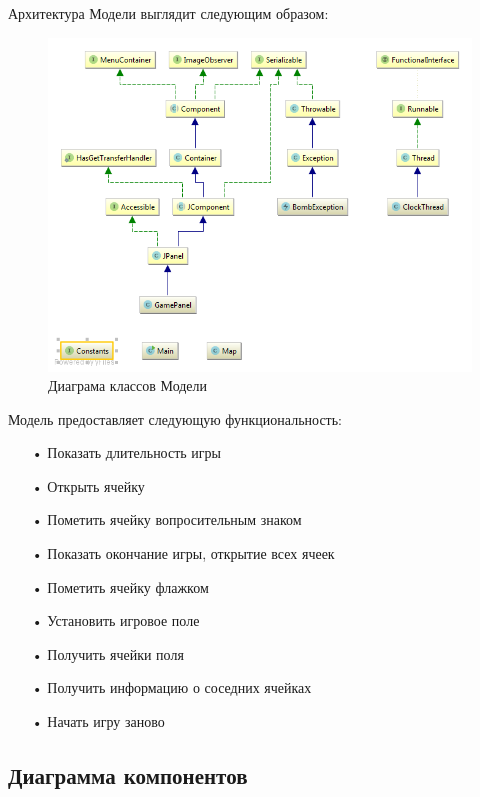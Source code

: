 Архитектура Модели выглядит следующим образом:
\begin{figure}[H]
	\begin{center}
		\includegraphics[scale=0.7]{images/diagram0.png}
		\caption{Диаграма классов Модели} 
		\label{pic:pic_name} %
	\end{center}
\end{figure}

Модель предоставляет следующую функциональность:

\begin{enumerate}  
\item[•]  Показать длительность игры
\item[•]  Открыть ячейку
\item[•]  Пометить ячейку вопросительным знаком
\item[•]  Показать окончание игры, открытие всех ячеек
\item[•]  Пометить ячейку флажком
\item[•]  Установить игровое поле
\item[•]  Получить ячейки поля
\item[•]  Получить информацию о соседних ячейках
\item[•]  Начать игру заново
\end{enumerate}

\subsection{Диаграмма компонентов}

